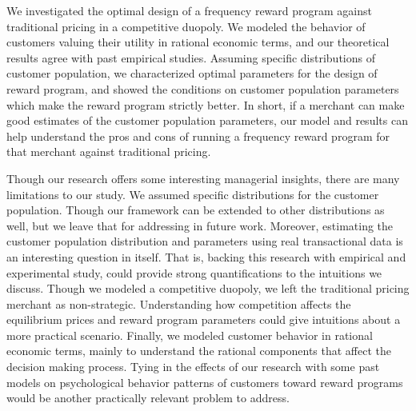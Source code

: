 We investigated the optimal design of a frequency reward program against traditional pricing in a competitive duopoly.
We modeled the behavior of customers valuing their utility in rational economic terms, and our theoretical results agree with past empirical studies.
Assuming specific distributions of customer population, we characterized optimal parameters for the design of reward program, and showed the conditions on customer population parameters which make the reward program strictly better.
In short, if a merchant can make good estimates of the customer population parameters, our model and results can help understand the pros and cons of running a frequency reward program for that merchant against traditional pricing.

Though our research offers some interesting managerial insights, there are many limitations to our study. 
We assumed specific distributions for the customer population. 
Though our framework can be extended to other distributions as well, but we leave that for addressing in future work.
Moreover, estimating the customer population distribution and parameters using real transactional data is an interesting question in itself.
That is, backing this research with empirical and experimental study, could provide strong quantifications to the intuitions we discuss.
Though we modeled a competitive duopoly, we left the traditional pricing merchant as non-strategic.
Understanding how competition affects the equilibrium prices and reward program parameters could give intuitions about a more practical scenario. 
Finally, we modeled customer behavior in rational economic terms, mainly to understand the rational components that affect the decision making process.
Tying in the effects of our research with some past models on psychological behavior patterns of customers toward reward programs would be another practically relevant problem to address.


